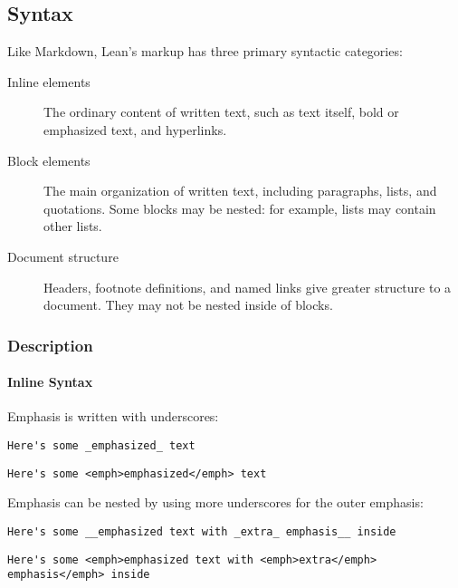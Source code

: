 \documentclass{memoir}
\begin{document}
\subsection{Syntax}

Like Markdown, Lean's markup has three primary syntactic categories:

\begin{description}
\item[ Inline elements] The ordinary content of written text, such as text itself, bold or emphasized text, and hyperlinks.\item[ Block elements] The main organization of written text, including paragraphs, lists, and quotations. Some blocks may be nested: for example, lists may contain other lists.\item[ Document structure] Headers, footnote definitions, and named links give greater structure to a document. They may not be nested inside of blocks.
\end{description}




\subsubsection{Description}



\paragraph{Inline Syntax}

Emphasis is written with underscores:

\begin{verbatim}
Here's some _emphasized_ text

\end{verbatim}
\begin{verbatim}
Here's some <emph>emphasized</emph> text

\end{verbatim}


Emphasis can be nested by using more underscores for the outer emphasis:

\begin{verbatim}
Here's some __emphasized text with _extra_ emphasis__ inside

\end{verbatim}
\begin{verbatim}
Here's some <emph>emphasized text with <emph>extra</emph> emphasis</emph> inside

\end{verbatim}
\end{document}
